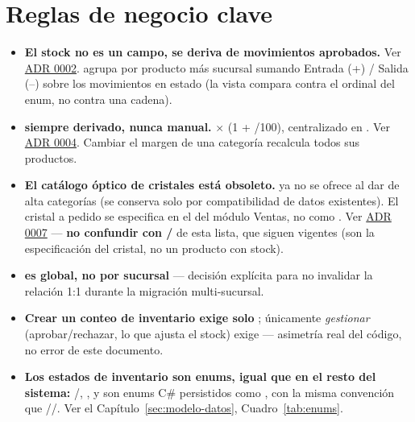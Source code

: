 \section{Reglas de negocio clave}
\label{sec:07-reglas}

\begin{itemize}
  \item \textbf{El stock no es un campo, se deriva de movimientos aprobados.} Ver \hyperref[adr:0002]{ADR 0002}.  agrupa por producto más sucursal sumando Entrada (+) / Salida (--) sobre los movimientos en estado  (la vista compara contra el ordinal del enum, no contra una cadena).
  \item \textbf{ siempre derivado, nunca manual.}  $\times$ (1 + \allowbreak {}/100), centralizado en \allowbreak {}. Ver \hyperref[adr:0004]{ADR 0004}. Cambiar el margen de una categoría recalcula todos sus productos.
  \item \textbf{El catálogo óptico de cristales está obsoleto.}  ya no se ofrece al dar de alta categorías (se conserva solo por compatibilidad de datos existentes). El cristal a pedido se especifica en el  del módulo Ventas, no como . Ver \hyperref[adr:0007]{ADR 0007} --- \textbf{no confundir con /} de esta lista, que siguen vigentes (son la especificación del cristal, no un producto con stock).
  \item \textbf{\allowbreak {}\allowbreak {} es global, no por sucursal} --- decisión explícita para no invalidar la relación 1:1 durante la migración multi-sucursal.
  \item \textbf{Crear un conteo de inventario exige solo }; únicamente \emph{gestionar} (aprobar/rechazar, lo que ajusta el stock) exige \allowbreak {} --- asimetría real del código, no error de este documento.
  \item \textbf{Los estados de inventario son enums, igual que en el resto del sistema:} \allowbreak {}/, \allowbreak {}, \allowbreak {} y \allowbreak {} son enums C\# persistidos como , con la misma convención que //. Ver el Capítulo~\ref{sec:modelo-datos}, Cuadro~\ref{tab:enums}.
\end{itemize}

